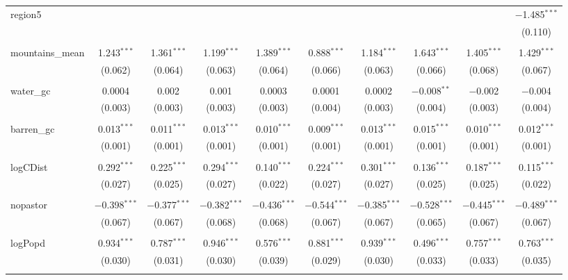 \begin{table}[!htbp]
\begin{tabular}{@{\extracolsep{5pt}}lccccccccc}
 region5 &  &  &  &  &  &  &  &  & $-$1.485$^{***}$ \\ 
  &  &  &  &  &  &  &  &  & (0.110) \\ 
  & & & & & & & & & \\ 
 mountains\_mean & 1.243$^{***}$ & 1.361$^{***}$ & 1.199$^{***}$ & 1.389$^{***}$ & 0.888$^{***}$ & 1.184$^{***}$ & 1.643$^{***}$ & 1.405$^{***}$ & 1.429$^{***}$ \\ 
  & (0.062) & (0.064) & (0.063) & (0.064) & (0.066) & (0.063) & (0.066) & (0.068) & (0.067) \\ 
  & & & & & & & & & \\ 
 water\_gc & 0.0004 & 0.002 & 0.001 & 0.0003 & 0.0001 & 0.0002 & $-$0.008$^{**}$ & $-$0.002 & $-$0.004 \\ 
  & (0.003) & (0.003) & (0.003) & (0.003) & (0.004) & (0.003) & (0.004) & (0.003) & (0.004) \\ 
  & & & & & & & & & \\ 
 barren\_gc & 0.013$^{***}$ & 0.011$^{***}$ & 0.013$^{***}$ & 0.010$^{***}$ & 0.009$^{***}$ & 0.013$^{***}$ & 0.015$^{***}$ & 0.010$^{***}$ & 0.012$^{***}$ \\ 
  & (0.001) & (0.001) & (0.001) & (0.001) & (0.001) & (0.001) & (0.001) & (0.001) & (0.001) \\ 
  & & & & & & & & & \\ 
 logCDist & 0.292$^{***}$ & 0.225$^{***}$ & 0.294$^{***}$ & 0.140$^{***}$ & 0.224$^{***}$ & 0.301$^{***}$ & 0.136$^{***}$ & 0.187$^{***}$ & 0.115$^{***}$ \\ 
  & (0.027) & (0.025) & (0.027) & (0.022) & (0.027) & (0.027) & (0.025) & (0.025) & (0.022) \\ 
  & & & & & & & & & \\ 
 nopastor & $-$0.398$^{***}$ & $-$0.377$^{***}$ & $-$0.382$^{***}$ & $-$0.436$^{***}$ & $-$0.544$^{***}$ & $-$0.385$^{***}$ & $-$0.528$^{***}$ & $-$0.445$^{***}$ & $-$0.489$^{***}$ \\ 
  & (0.067) & (0.067) & (0.068) & (0.068) & (0.067) & (0.067) & (0.065) & (0.067) & (0.067) \\ 
  & & & & & & & & & \\ 
 logPopd & 0.934$^{***}$ & 0.787$^{***}$ & 0.946$^{***}$ & 0.576$^{***}$ & 0.881$^{***}$ & 0.939$^{***}$ & 0.496$^{***}$ & 0.757$^{***}$ & 0.763$^{***}$ \\ 
  & (0.030) & (0.031) & (0.030) & (0.039) & (0.029) & (0.030) & (0.033) & (0.033) & (0.035) \\ 
  & & & & & & & & & \\ 

\end{tabular}
\end{table}
